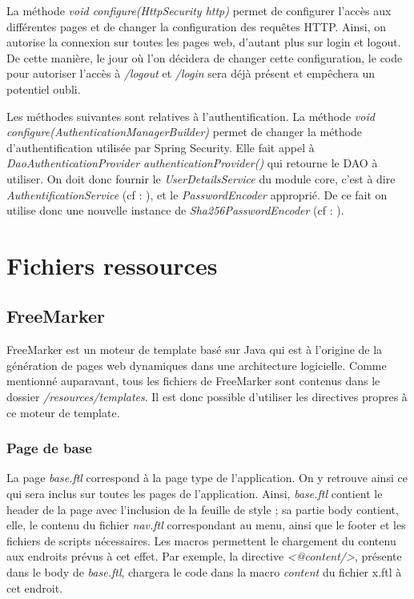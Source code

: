 			La méthode \textit{void configure(HttpSecurity http)} permet de configurer l'accès aux différentes pages et de changer la configuration des requêtes HTTP. Ainsi, on autorise la connexion sur toutes les pages web, d'autant plus sur login et logout. De cette manière, le jour où l'on décidera de changer cette configuration, le code pour autoriser l'accès à \textit{/logout} et \textit{/login} sera déjà présent et empêchera un potentiel oubli.

			\noindent
			Les méthodes suivantes sont relatives à l'authentification. La méthode \textit{void configure(AuthenticationManagerBuilder)} permet de changer la méthode d'authentification utilisée par Spring Security. Elle fait appel à \textit{DaoAuthenticationProvider authenticationProvider()} qui retourne le DAO à utiliser. On doit donc fournir le \textit{UserDetailsService} du module core, c'est à dire \textit{AuthentificationService} (cf : ), et le \textit{PasswordEncoder} approprié. De ce fait on utilise donc une nouvelle instance de \textit{Sha256PasswordEncoder} (cf : ).

	\newpage
	\section{Fichiers ressources}

		\subsection{FreeMarker}

			FreeMarker est un moteur de template basé sur Java qui est à l'origine de la génération de pages web dynamiques dans une architecture logicielle.\newline
			Comme mentionné auparavant, tous les fichiers de FreeMarker sont contenus dans le dossier \textit{/resources/templates}. Il est donc possible d'utiliser les directives propres à ce moteur de template.


			\subsubsection{Page de base}

				La page \textit{base.ftl} correspond à la page type de l'application. On y retrouve ainsi ce qui sera inclus sur toutes les pages de l'application. \newline
				Ainsi, \textit{base.ftl} contient le header de la page avec l'inclusion de la feuille de style ; sa partie body contient, elle, le contenu du fichier \textit{nav.ftl} correspondant au menu, ainsi que le footer et les fichiers de scripts nécessaires.\newline
				Les macros permettent le chargement du contenu aux endroits prévus à cet effet. Par exemple, la directive \textit{<@content/>}, présente dans le body de \textit{base.ftl}, chargera le code dans la macro \textit{content} du fichier x.ftl à cet endroit.

